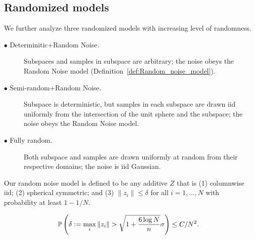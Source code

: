 \documentclass{ctexart}
\begin{document}
\subsection{Randomized models}
We  further analyze three randomized models with increasing level of randomness.
\begin{description}
  \item[$\bullet$ Determinitic+Random Noise.] Subspaces and samples in subspace are arbitrary; the noise obeys the Random Noise model (Definition~\ref{def:Random_noise_model}).
  \item[$\bullet$ Semi-random+Random Noise.] Subspace is deterministic, but samples in each subspace are drawn iid uniformly from the intersection of the unit sphere and the subspace; the noise obeys the Random Noise model.
  \item[$\bullet$ Fully random.] Both subspace and samples are drawn uniformly at random from their respective domains; the noise is iid Gaussian.%
\end{description}

\begin{definition}\label{def:Random_noise_model}
Our random noise model is defined to be any additive $Z$ that is (1) columnwise iid; (2) spherical symmetric;  and (3) $\|z_i\|\leq \delta$ for all $i=1,...,N$ with probability at least $1-1/N$.
\end{definition}
$$\P\left(\delta:=\max_i\|z_i\| > \sqrt{1+\frac{6\log N}{n}}\sigma\right) \leq C/N^2.$$
\end{document}
